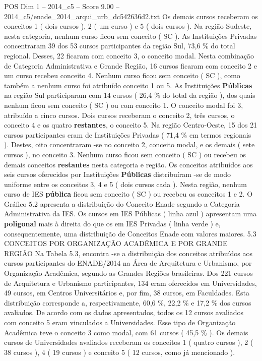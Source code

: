 \begin{textsample}{POS Dim 1 – 2014\_c5 – Score 9.00 – 2014\_c5/enade\_2014\_arqui\_urb\_dc542636d2.txt}
Os demais cursos receberam os conceitos 1 ( dois cursos ), 2 ( um curso ) e 5 ( dois cursos ).
Na região Sudeste, nesta categoria, nenhum curso ficou sem conceito ( SC ).
As Instituições Privadas concentraram 39 dos 53 cursos participantes da região Sul, 73,6 \% do total regional.
Desses, 22 ficaram com conceito 3, o conceito modal.
Nesta combinação de Categoria Administrativa e Grande Região, 16 cursos ficaram com conceito 2 e um curso recebeu conceito 4.
Nenhum curso ficou sem conceito ( SC ), como também a nenhum curso foi atribuído conceito 1 ou 5.
As Instituições \textbf{Públicas} na região Sul participaram com 14 cursos ( 26,4 \% do total da região ), dos quais nenhum ficou sem conceito ( SC ) ou com conceito 1.
O conceito modal foi 3, atribuído a cinco cursos.
Dois cursos receberam o conceito 2, três cursos, o conceito 4 e os quatro \textbf{restantes}, o conceito 5.
Na região Centro-Oeste, 15 dos 21 cursos participantes eram de Instituições Privadas ( 71,4 \% em termos regionais ).
Destes, oito concentraram -se no conceito 2, conceito modal, e os demais ( sete cursos ), no conceito 3.
Nenhum curso ficou sem conceito ( SC ) ou recebeu os demais conceitos \textbf{restantes} nesta categoria e região.
Os conceitos atribuídos aos seis cursos oferecidos por Instituições \textbf{Públicas} distribuíram -se de modo uniforme entre os conceitos 3, 4 e 5 ( dois cursos cada ).
Nesta região, nenhum curso de IES \textbf{pública} ficou sem conceito ( SC ) ou recebeu os conceitos 1 e 2.
O Gráfico 5.2 apresenta a distribuição do Conceito Enade segundo a Categoria Administrativa da IES.
Os cursos em IES Públicas ( linha azul ) apresentam uma \textbf{poligonal} mais à direita do que os em IES Privadas ( linha verde ) e, consequentemente, uma distribuição de Conceitos Enade com valores maiores. 5.3 CONCEITOS POR ORGANIZAÇÃO ACADÊMICA E POR GRANDE REGIÃO Na Tabela 5.3, encontra -se a distribuição dos conceitos atribuídos aos cursos participantes do ENADE/2014 na Área de Arquitetura e Urbanismo, por Organização Acadêmica, segundo as Grandes Regiões brasileiras.
Dos 221 cursos de Arquitetura e Urbanismo participantes, 134 eram oferecidos em Universidades, 49 cursos, em Centros Universitários e, por fim, 38 cursos, em Faculdades.
Esta distribuição corresponde a, respectivamente, 60,6 \%, 22,2 \% e 17,2 \% dos cursos avaliados.
De acordo com os dados apresentados, todos os 12 cursos avaliados com conceito 5 eram vinculados a Universidades.
Esse tipo de Organização Acadêmica teve o conceito 3 como modal, com 61 cursos ( 45,5 \% ).
Os demais cursos de Universidades avaliados receberam os conceitos 1 ( quatro cursos ), 2 ( 38 cursos ), 4 ( 19 cursos ) e conceito 5 ( 12 cursos, como já mencionado ).

\end{textsample}
